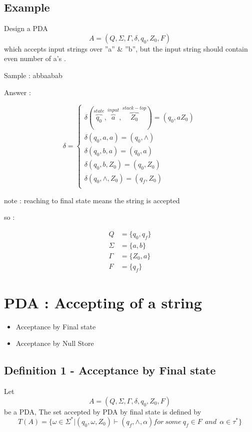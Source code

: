\documentclass[12pt]{book}
\begin{document}
\subsection{Example}

Design a PDA 
$$
A = (Q,\Sigma,\Gamma,\delta,q_{0},Z_{0},F)
$$
which accepts input strings over ''a'' \& ''b'', but the input string should contain even number of a's .

Sample : abbaabab

Answer :

$$
\delta = 
\begin{cases}
\delta(\overbrace{q_{0}}^{state},\overbrace{a}^{input},\overbrace{Z_{0}}^{stack-top}) = (q_{0}, aZ_{0}) \\
\delta(q_{0},a,a) = (q_{0},\wedge) \\
\delta(q_{0},b,a) = (q_{0},a) \\
\delta(q_{0},b,Z_{0}) = (q_{0},Z_{0}) \\
\delta(q_{0},\wedge,Z_{0}) = (q_{f},Z_{0}) \\
\end{cases}
$$

note : reaching to final state means the string is accepted

so :

\begin{align*}
Q &= \{ q_{0}, q_{f} \} \\
\Sigma &= \{ a, b \} \\
\Gamma &= \{ Z_{0}, a \} \\
F &= \{ q_{f} \} 
\end{align*}


\section{PDA : Accepting of a string}

\begin{itemize}
	\item Acceptance by Final state
	\item Acceptance by Null Store
\end{itemize}

\subsection{Definition 1 - Acceptance by Final state}

Let 
$$
A = (Q,\Sigma,\Gamma,\delta,q_{0},Z_{0},F)
$$
be a PDA, The set accepted by PDA by final state is defined by 
$$
T(A) = \{ \omega \in \Sigma^{*} | (q_{0},\omega,Z_{0}) \vdash (q_{f}, \wedge, \alpha ) for \: some \: q_{f} \in F \:\: and \:\: \alpha \in \tau^{*}  \}
$$
\end{document}
